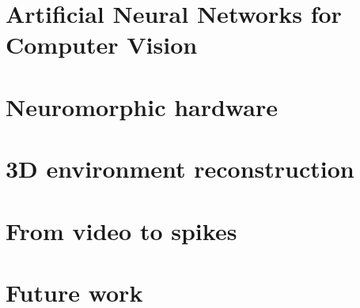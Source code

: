 \documentclass[11pt,a4paper,oneside]{memoir}
\begin{document}
\newpage\null\thispagestyle{empty}\newpage

  \chapter{Artificial Neural Networks for Computer Vision}
  \label{chp:vision}
  

\newpage\null\thispagestyle{empty}\newpage

  \chapter{Neuromorphic hardware}
  \label{chp:neuro-hw}
  

\newpage\null\thispagestyle{empty}\newpage

  \chapter{3D environment reconstruction}
  \label{chp:reconstruction}
  

\newpage\null\thispagestyle{empty}\newpage

  \chapter{From video to spikes}
  \label{chp:img2spk}
  

\newpage\null\thispagestyle{empty}\newpage

  \chapter{Future work}
  \label{chp:conclusions}
  

  \printbibliography
\end{document}
